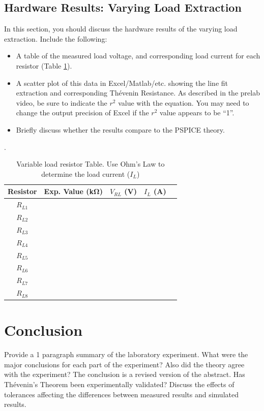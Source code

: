 \documentclass[11pt]{article}
\begin{document}
  \subsection{Hardware Results: Varying Load Extraction}
  In this section, you should discuss the hardware results of the varying load extraction.  Include the following:
  \begin{itemize}
  	\item A table of the measured load voltage, and corresponding load current for each resistor (Table \ref{Table:Lab3LoadResistors}).
  	\item A scatter plot of this data  in Excel/Matlab/etc. showing the line fit extraction and corresponding Th\'evenin Resistance.   As described in the prelab video, be sure to indicate the $r^2$  value with the equation. You may need to change the output precision of Excel if the $r^2$ value appears to be ``1''. 
  	\item Briefly discuss whether the results compare to the PSPICE theory.
  \end{itemize}
  	\begin{table}[h!]
  		\centering
  		\caption{Variable load resistor Table.  Use Ohm's Law to determine the load current ($I_L$)}.
  		\label{Table:Lab3LoadResistors}
  		\begin{tabular}{|c||c|c|c|c|}
  			\hline
  			Resistor &Exp. Value (\si{\kilo\ohm}) &$V_{RL}$ (\si{\volt}) & $I_L$ (\si{\ampere}) \\
  			\hline
  			$R_{L1}$  & & & \\	 \hline 
  			$R_{L2}$  & & & \\	 \hline 
  			$R_{L3}$  & & & \\	 \hline 
  			$R_{L4}$  & & & \\	 \hline 
  			$R_{L5}$  & & & \\	 \hline 
  			$R_{L6}$  & & & \\	 \hline
  			$R_{L7}$  & & & \\	 \hline
  			$R_{L8}$  & & & \\	 \hline 
  		\end{tabular}
  	\end{table}
 
	\section{Conclusion}
	Provide a 1 paragraph summary of the laboratory experiment.  What were the major conclusions for each part of the experiment?  Also did the theory agree with the experiment?  The conclusion is a revised version of the abstract.  Has Th\'evenin's Theorem been experimentally validated?  Discuss the effects of tolerances affecting the differences between measured results and simulated results.
\end{document}
